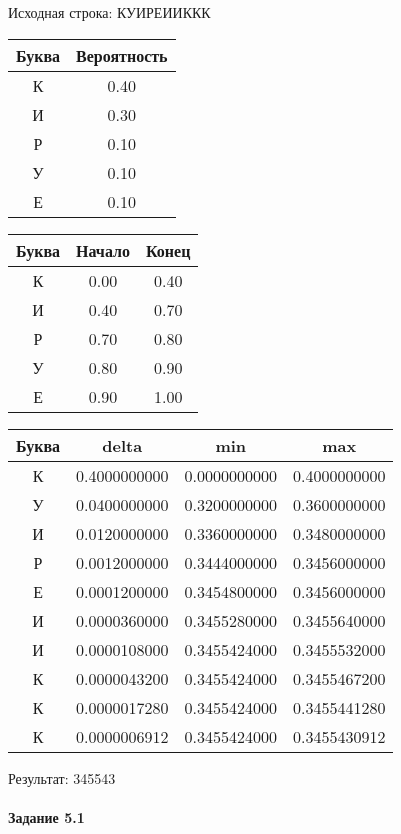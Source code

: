 \documentclass[a4paper, 12pt]{article}
\begin{document}
Исходная строка: КУИРЕИИККК\
\begin{center}
 \begin{tabular}{ |c|c| } 
  \hline
     Буква & Вероятность \\ \hline
К & 0.40\\\hline
И & 0.30\\\hline
Р & 0.10\\\hline
У & 0.10\\\hline
Е & 0.10
\\ \hline \end{tabular}
\end{center}
\begin{center}
 \begin{tabular}{ |c|c|c| } 
  \hline
     Буква & Начало & Конец \\ \hline
К & 0.00 & 0.40\\\hline
И & 0.40 & 0.70\\\hline
Р & 0.70 & 0.80\\\hline
У & 0.80 & 0.90\\\hline
Е & 0.90 & 1.00
\\ \hline \end{tabular}
\end{center}
\begin{center}
 \begin{tabular}{ |c|c|c|c| } 
  \hline
     Буква & delta & min & max \\ \hline
К & 0.4000000000 & 0.0000000000 & 0.4000000000\\\hline
У & 0.0400000000 & 0.3200000000 & 0.3600000000\\\hline
И & 0.0120000000 & 0.3360000000 & 0.3480000000\\\hline
Р & 0.0012000000 & 0.3444000000 & 0.3456000000\\\hline
Е & 0.0001200000 & 0.3454800000 & 0.3456000000\\\hline
И & 0.0000360000 & 0.3455280000 & 0.3455640000\\\hline
И & 0.0000108000 & 0.3455424000 & 0.3455532000\\\hline
К & 0.0000043200 & 0.3455424000 & 0.3455467200\\\hline
К & 0.0000017280 & 0.3455424000 & 0.3455441280\\\hline
К & 0.0000006912 & 0.3455424000 & 0.3455430912
\\ \hline \end{tabular}
\end{center}
Результат: 345543
\pagebreak
\paragraph{Задание 5.1 \\
}
\end{document}
